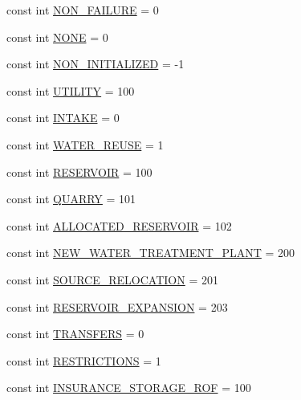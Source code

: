 \begin{DoxyCompactItemize}
\item 
const int \mbox{\hyperlink{namespaceConstants_a0595423b130c1645b173272f50338ed9}{N\+O\+N\+\_\+\+F\+A\+I\+L\+U\+RE}} = 0
\item 
const int \mbox{\hyperlink{namespaceConstants_a79ee092c4ca31cde9669f70d505eeca5}{N\+O\+NE}} = 0
\item 
const int \mbox{\hyperlink{namespaceConstants_a8e8b0a537619c378d03117c5ed1c3ea1}{N\+O\+N\+\_\+\+I\+N\+I\+T\+I\+A\+L\+I\+Z\+ED}} = -\/1
\item 
const int \mbox{\hyperlink{namespaceConstants_a5ea4764afe0d01f0a38edfd66e806710}{U\+T\+I\+L\+I\+TY}} = 100
\item 
const int \mbox{\hyperlink{namespaceConstants_adb591bf3b5663c16cf71d3cbb044c3b3}{I\+N\+T\+A\+KE}} = 0
\item 
const int \mbox{\hyperlink{namespaceConstants_aebb21b9413741e893ea6a79e379e9ec6}{W\+A\+T\+E\+R\+\_\+\+R\+E\+U\+SE}} = 1
\item 
const int \mbox{\hyperlink{namespaceConstants_a127d57d404f178c91f8ed88823e24088}{R\+E\+S\+E\+R\+V\+O\+IR}} = 100
\item 
const int \mbox{\hyperlink{namespaceConstants_ac5f85f1f073e01d6d42ac8b19fc73f1e}{Q\+U\+A\+R\+RY}} = 101
\item 
const int \mbox{\hyperlink{namespaceConstants_a2769e2f1bc080457c78297402e78c8d1}{A\+L\+L\+O\+C\+A\+T\+E\+D\+\_\+\+R\+E\+S\+E\+R\+V\+O\+IR}} = 102
\item 
const int \mbox{\hyperlink{namespaceConstants_a6166f1b56ea9e9bfd63ac77cb99da31a}{N\+E\+W\+\_\+\+W\+A\+T\+E\+R\+\_\+\+T\+R\+E\+A\+T\+M\+E\+N\+T\+\_\+\+P\+L\+A\+NT}} = 200
\item 
const int \mbox{\hyperlink{namespaceConstants_ab321801ef588e5083ec368d310871523}{S\+O\+U\+R\+C\+E\+\_\+\+R\+E\+L\+O\+C\+A\+T\+I\+ON}} = 201
\item 
const int \mbox{\hyperlink{namespaceConstants_a27567a2a62ed837986156cb424fdc83f}{R\+E\+S\+E\+R\+V\+O\+I\+R\+\_\+\+E\+X\+P\+A\+N\+S\+I\+ON}} = 203
\item 
const int \mbox{\hyperlink{namespaceConstants_a02748ff742cda86e055625ce8ca43133}{T\+R\+A\+N\+S\+F\+E\+RS}} = 0
\item 
const int \mbox{\hyperlink{namespaceConstants_a15c13d76b55f85fae5635ec62063c0d9}{R\+E\+S\+T\+R\+I\+C\+T\+I\+O\+NS}} = 1
\item 
const int \mbox{\hyperlink{namespaceConstants_a459317d221226a86ebf5b00a4f87eaa7}{I\+N\+S\+U\+R\+A\+N\+C\+E\+\_\+\+S\+T\+O\+R\+A\+G\+E\+\_\+\+R\+OF}} = 100
\item 

\end{DoxyCompactItemize}
